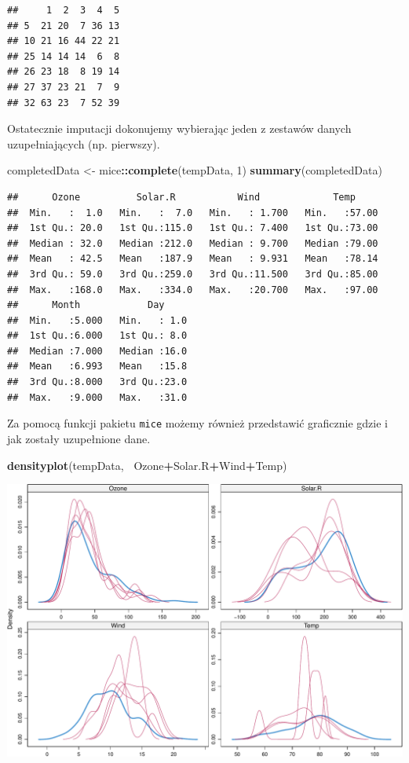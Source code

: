 \documentclass[]{book}
\newenvironment{Shaded}{\begin{snugshade}}{\end{snugshade}}
\newcommand{\DecValTok}[1]{\textcolor[rgb]{0.00,0.00,0.81}{#1}}
\newcommand{\KeywordTok}[1]{\textcolor[rgb]{0.13,0.29,0.53}{\textbf{#1}}}
\newcommand{\NormalTok}[1]{#1}
\newcommand{\OperatorTok}[1]{\textcolor[rgb]{0.81,0.36,0.00}{\textbf{#1}}}
\newcommand{\StringTok}[1]{\textcolor[rgb]{0.31,0.60,0.02}{#1}}
\theoremstyle{plain}
\theoremstyle{definition}
\theoremstyle{definition}
\theoremstyle{definition}
\theoremstyle{definition}
\theoremstyle{remark}
\begin{document}
\begin{verbatim}
##     1  2  3  4  5
## 5  21 20  7 36 13
## 10 21 16 44 22 21
## 25 14 14 14  6  8
## 26 23 18  8 19 14
## 27 37 23 21  7  9
## 32 63 23  7 52 39
\end{verbatim}

Ostatecznie imputacji dokonujemy wybierając jeden z zestawów danych uzupełniających (np. pierwszy).

\begin{Shaded}
\begin{Highlighting}[]
\NormalTok{completedData <-}\StringTok{ }\NormalTok{mice}\OperatorTok{::}\KeywordTok{complete}\NormalTok{(tempData, }\DecValTok{1}\NormalTok{)}
\KeywordTok{summary}\NormalTok{(completedData)}
\end{Highlighting}
\end{Shaded}

\begin{verbatim}
##      Ozone          Solar.R           Wind             Temp      
##  Min.   :  1.0   Min.   :  7.0   Min.   : 1.700   Min.   :57.00  
##  1st Qu.: 20.0   1st Qu.:115.0   1st Qu.: 7.400   1st Qu.:73.00  
##  Median : 32.0   Median :212.0   Median : 9.700   Median :79.00  
##  Mean   : 42.5   Mean   :187.9   Mean   : 9.931   Mean   :78.14  
##  3rd Qu.: 59.0   3rd Qu.:259.0   3rd Qu.:11.500   3rd Qu.:85.00  
##  Max.   :168.0   Max.   :334.0   Max.   :20.700   Max.   :97.00  
##      Month            Day      
##  Min.   :5.000   Min.   : 1.0  
##  1st Qu.:6.000   1st Qu.: 8.0  
##  Median :7.000   Median :16.0  
##  Mean   :6.993   Mean   :15.8  
##  3rd Qu.:8.000   3rd Qu.:23.0  
##  Max.   :9.000   Max.   :31.0
\end{verbatim}

Za pomocą funkcji pakietu \texttt{mice} możemy również przedstawić graficznie gdzie i jak zostały uzupełnione dane.

\begin{Shaded}
\begin{Highlighting}[]
\KeywordTok{densityplot}\NormalTok{(tempData, }\OperatorTok{~}\NormalTok{Ozone}\OperatorTok{+}\NormalTok{Solar.R}\OperatorTok{+}\NormalTok{Wind}\OperatorTok{+}\NormalTok{Temp)}
\end{Highlighting}
\end{Shaded}

\includegraphics{EksploracjaDanych_files/figure-latex/unnamed-chunk-9-1.pdf}
\end{document}
